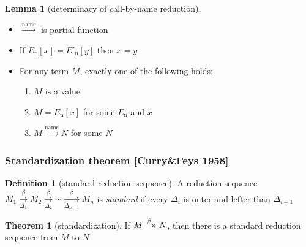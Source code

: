\documentclass[dvipdfmx,cjk,xcolor=dvipsnames,envcountsect,notheorems,12pt]{beamer}
\theoremstyle{definition}
\newtheorem{definition}{Definition}
\newtheorem{theorem}{Theorem}
\newtheorem{lemma}{Lemma}
\newcommand{\xtwoheadrightarrow}[2][]{%
  \xrightarrow[#1]{#2}\mathrel{\mkern-14mu}\rightarrow
}
\newcommand{\CALLBYNAME}{\xrightarrow{\mathrm{name}}}
\newcommand{\RTCLOSFULLBETA}{\xtwoheadrightarrow{\beta}}
\begin{document}
\begin{frame}
	\begin{lemma}[determinacy of call-by-name reduction]
	\begin{itemize}
		\item $\CALLBYNAME$ is partial function
		\item If $E_\mathrm{n}[x]=E'_\mathrm{n}[y]$ then $x=y$
		\item For any term $M$, \alert{exactly one} of the following holds:
			\begin{enumerate}
				\item $M$ is a value
				\item $M=E_\mathrm{n}[x]$ for some $E_\mathrm{n}$ and $x$
				\item $M \CALLBYNAME N$ for some $N$
			\end{enumerate}
	\end{itemize}
	\end{lemma}
\end{frame}

\begin{frame}
	\frametitle{Standardization theorem [Curry\&Feys 1958]}
	\Large
	\begin{definition}[standard reduction sequence]
		A reduction sequence $M_1\xrightarrow[\Delta_1]{\beta}M_2\xrightarrow[\Delta_2]{\beta} \cdots \xrightarrow[\Delta_{n-1}]{\beta} M_n$
		is \textit{standard} if every $\Delta_i$ is outer and lefter than $\Delta_{i+1}$
	\end{definition}
	\begin{theorem}[standardization]
		If $M\RTCLOSFULLBETA N$, then there is a standard reduction sequence from $M$ to $N$
	\end{theorem}
\end{frame}
\end{document}
